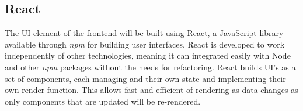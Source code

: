 \subsection{React}
The UI element of the frontend will be built using React, a JavaScript library available through \textit{npm} for building user interfaces. React is developed to work independently of other technologies, meaning it can integrated easily with Node and other \textit{npm} packages without the needs for refactoring. React builds UI's as a set of components, each managing and their own state and implementing their own render function. This allows fast and efficient of rendering as data changes as only components that are updated will be re-rendered. 


